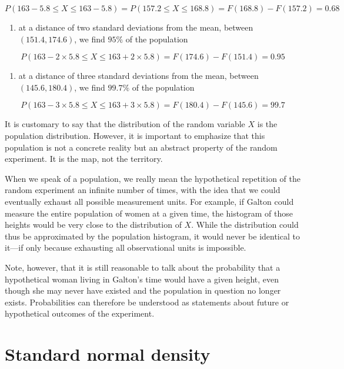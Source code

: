 \documentclass[
]{book}
\providecommand{\tightlist}{%
  \setlength{\itemsep}{0pt}\setlength{\parskip}{0pt}}
\begin{document}
\[P(163-5.8 \leq X \leq 163-5.8)=P(157.2 \leq X \leq 168.8)=F(168.8)-F(157.2)=0.68\]

\begin{enumerate}
\def\labelenumi{\arabic{enumi})}
\setcounter{enumi}{1}
\tightlist
\item
  at a distance of two standard deviations from the mean, between \((151.4, 174.6)\), we find \(95\%\) of the population
\end{enumerate}

\[P(163-2 \times 5.8 \leq X \leq 163+2\times 5.8)=F(174.6)-F(151.4)=0.95\]

\begin{enumerate}
\def\labelenumi{\arabic{enumi})}
\setcounter{enumi}{2}
\tightlist
\item
  at a distance of three standard deviations from the mean, between \((145.6, 180.4)\), we find \(99.7\%\) of the population
\end{enumerate}

\[P(163-3 \times 5.8 \leq X \leq 163+3\times 5.8)=F( 180.4)-F(145.6)=99.7\]

It is customary to say that the distribution of the random variable \(X\) is the population distribution. However, it is important to emphasize that this population is not a concrete reality but an abstract property of the random experiment. It is the map, not the territory.

When we speak of a population, we really mean the hypothetical repetition of the random experiment an infinite number of times, with the idea that we could eventually exhaust all possible measurement units. For example, if Galton could measure the entire population of women at a given time, the histogram of those heights would be very close to the distribution of \(X\). While the distribution could thus be approximated by the population histogram, it would never be identical to it---if only because exhausting all observational units is impossible.

Note, however, that it is still reasonable to talk about the probability that a hypothetical woman living in Galton's time would have a given height, even though she may never have existed and the population in question no longer exists. Probabilities can therefore be understood as statements about future or hypothetical outcomes of the experiment.

\hypertarget{standard-normal-density}{%
\section{Standard normal density}\label{standard-normal-density}}
\end{document}
